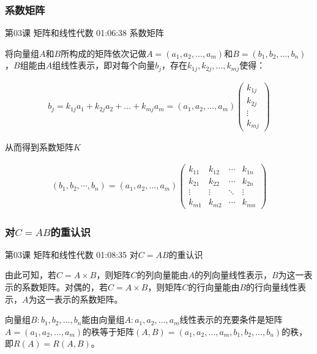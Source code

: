 \documentclass[UTF8]{ctexbook}
\begin{document}
\subsubsection{系数矩阵}

第03课 矩阵和线性代数 01:06:38 系数矩阵

将向量组$A$和$B$所构成的矩阵依次记做$A=(a_{1},a_{2},\dots,a_{m})$和$B=(b_{1},b_{2},\dots,b_{n})$，$B$组能由$A$组线性表示，即对每个向量$b_{j}$，存在$k_{1j},k_{2j},\dots,k_{mj}$使得：

\begin{equation}
\begin{aligned}
b_{j}=k_{1j}a_{1}+k_{2j}a_{2}+\dots+k_{mj}a_{m}
=(a_{1},a_{2},\dots,a_{m}) \begin{pmatrix} k_{1j} \\ k_{2j} \\ \vdots \\ k_{mj} \end{pmatrix}
\end{aligned}
\end{equation}

从而得到系数矩阵$K$

\begin{equation}
\begin{aligned}
(b_{1},b_{2},\cdots,b_{n})
=(a_{1},a_{2},\dots,a_{m})
\begin{pmatrix}
k_{11} & k_{12} & \cdots & k_{1n} \\
k_{21} & k_{22} & \cdots & k_{2n} \\
\vdots & \vdots & \ddots & \vdots \\
k_{m1} & k_{m2} & \cdots & k_{mn}
\end{pmatrix}
\end{aligned}
\end{equation}

\subsubsection{对$C=AB$的重认识}

第03课 矩阵和线性代数 01:08:35 对$C=AB$的重认识

由此可知，若$C=A \times B$，则矩阵$C$的列向量能由$A$的列向量线性表示，$B$为这一表示的系数矩阵。对偶的，若$C=A \times B$，则矩阵$C$的行向量能由$B$的行向量线性表示，$A$为这一表示的系数矩阵。

向量组$B:b_{1},b_{2},\dots,b_{n}$能由向量组$A:a_{1},a_{2},\dots,a_{m}$线性表示的充要条件是矩阵$A=(a_{1},a_{2},\dots,a_{m})$的秩等于矩阵$(A,B)=(a_{1},a_{2},\dots,a_{m},b_{1},b_{2},\dots,b_{n})$的秩，即$R(A)=R(A,B)$。
\end{document}
